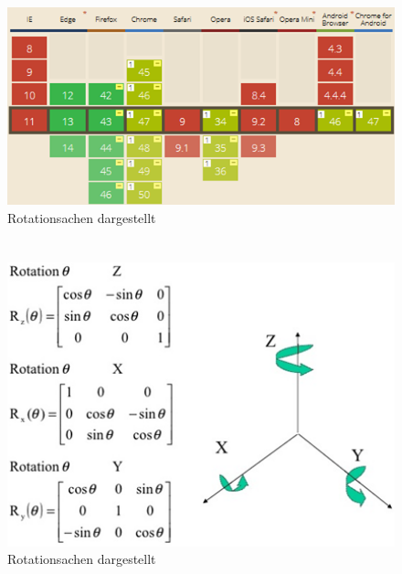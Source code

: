 \documentclass[a4paper]{spie}  %
\begin{document}
\begin{appendices}
	\begin{figure}[H]
		\includegraphics{images/caniuseGetUserMedia}
		\caption{Rotationsachen dargestellt}
		\label{app:caniuseMedia}
	\end{figure}


\section{}
\begin{figure}[H]
	\centering
	\includegraphics[width=1\textwidth]{images/rotation}
	\caption{Rotationsachen dargestellt}
	\label{rotation}
\end{figure}


\end{appendices}
\end{document}
